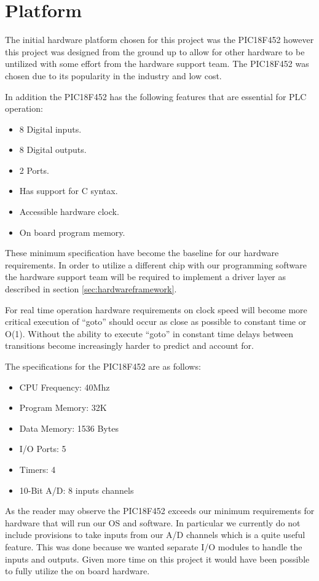\section{Platform}
\label{sec:hardwareplatform}

The initial hardware platform chosen for this project was the PIC18F452 however this project was designed from the ground up to allow for other hardware to be untilized with some effort from the hardware support team. The PIC18F452 was chosen due to its popularity in the industry and low cost.

In addition the PIC18F452 has the following features that are essential for PLC operation:

\begin{itemize}
\item 8 Digital inputs.
\item 8 Digital outputs.
\item 2 Ports.
\item Has support for C syntax.
\item Accessible hardware clock.
\item On board program memory.
\end{itemize}

These minimum specification have become the baseline for our hardware requirements. In order to utilize a different chip with our programming software the hardware support team will be required to implement a driver layer as described in section \ref{sec:hardwareframework}.

For real time operation hardware requirements on clock speed will become more critical execution of ``goto'' should occur as close as possible to constant time or O(1). Without the ability to execute ``goto'' in constant time delays between transitions become increasingly harder to predict and account for.

The specifications for the PIC18F452 are as follows:
\begin{itemize}
	\item CPU Frequency: 40Mhz
	\item Program Memory: 32K
	\item Data Memory: 1536 Bytes
	\item I/O Ports: 5
	\item Timers: 4
	\item 10-Bit A/D: 8 inputs channels
\end{itemize}

As the reader may observe the PIC18F452 exceeds our minimum requirements for hardware that will run our OS and software. In particular we currently do not include provisions to take inputs from our A/D channels which is a quite useful feature. This was done because we wanted separate I/O modules to handle the inputs and outputs. Given more time on this project it would have been possible to fully utilize the on board hardware.
